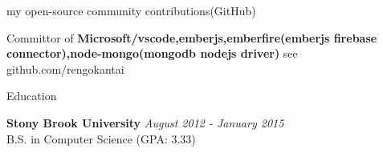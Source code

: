 \documentclass{resume} %
\begin{document}
\begin{rSection}{my open-source community contributions(GitHub)}

Committor of {\bf Microsoft/vscode,emberjs,emberfire(emberjs firebase connector),node-mongo(mongodb nodejs driver)} see github.com/rengokantai


\end{rSection}














\begin{rSection}{Education}

{\bf Stony Brook University} \hfill {\em August 2012 - January 2015} \\ 
B.S. in Computer Science (GPA: 3.33)  
\end{rSection}
\end{document}
